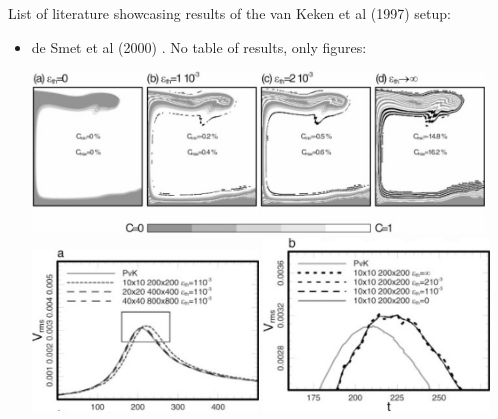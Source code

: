 List of literature showcasing results of the van Keken et al (1997) \cite{vaks97} setup:
\begin{itemize}
\item de Smet et al (2000) \cite{devv00a}. No table of results, only figures:
\begin{center}
\includegraphics[width=12cm]{images/benchmark_vaks97/devv00a_1}\\
\includegraphics[width=6cm]{images/benchmark_vaks97/devv00a_2}
\includegraphics[width=6cm]{images/benchmark_vaks97/devv00a_3}
\end{center}


\end{itemize}

